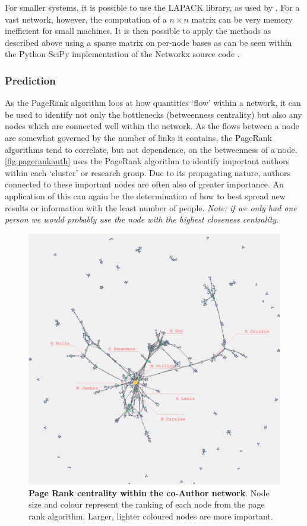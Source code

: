 For smaller systems, it is possible to use the LAPACK \citep{lapack} library, as used by \cite{numpy}. For a vast network, however, the computation of a $n \times n $ matrix can be very memory inefficient for small machines. It is then possible to apply the methods as described above using a sparse matrix on per-node bases as can be seen within the Python SciPy implementation of the Networkx source code \citep{scipy,networkx}.

\subsubsection{Prediction}\label{sec:applypr}
As the PageRank algorithm loos at how quantities `flow' within a network, it can be used to identify not only the bottlenecks (betweenness centrality) but also any nodes which are connected well within the network. As the flows between a node are somewhat governed by the number of links it contains, the PageRank algorithms tend to correlate, but not dependence, on the betweenness of a node. \autoref{fig:pagerankauth} uses the PageRank algorithm to identify important authors within each `cluster' or research group. Due to its propagating nature, authors connected to these important nodes are often also of greater importance. An application of this can again be the determination of how to best spread new results or information with the least number of people. \textit{Note: if we only had one person we would probably use the node with the highest closeness centrality.}

\begin{figure}[H]
     \centering
         \includegraphics[width=.8\textwidth]{figures_c3/pagerankauthor.png}

        
                \caption{ \textbf{Page Rank centrality within the co-Author network}. Node size and colour represent the ranking of each node from the page rank algorithm. Larger, lighter coloured nodes are more important.}
        \label{fig:pagerankauth}
\end{figure}


